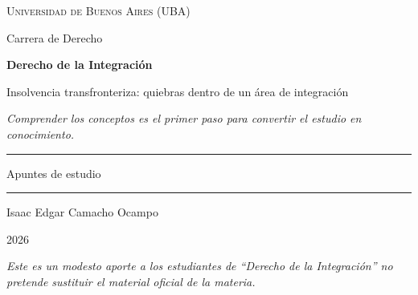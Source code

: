 \documentclass[12pt,oneside]{book}
\newcommand{\universidad}{Universidad de Buenos Aires (UBA)}
\newcommand{\carrera}{Carrera de Derecho}
\newcommand{\materia}{Derecho de la Integración}
\newcommand{\titulo}{Insolvencia transfronteriza: quiebras dentro de un área de integración}
\newcommand{\autor}{Isaac Edgar Camacho Ocampo}
\newcommand{\anio}{2026}
\begin{document}
\begin{titlepage}

\thispagestyle{empty}

\begin{center}

\vspace*{1cm}

{\large \textsc{\universidad}}

\vspace{0.2cm}

{\large \carrera}

\vspace{3cm}

{\Huge \textbf{\materia}}

\vspace{1cm}

{\LARGE \titulo}

\vspace{0.8cm}

\textit{Comprender los conceptos es el primer paso para convertir el estudio en conocimiento.}

\vspace{1.2cm}

\rule{0.70\textwidth}{0.5pt}

\vspace{0.5cm}

{\large Apuntes de estudio}

\vspace{0.5cm}

\rule{0.70\textwidth}{0.5pt}

\vfill

{\large \autor}

\vspace{0.3cm}

{\large \anio}

\end{center}

\vfill

\begin{flushleft}
\textit{Este es un modesto aporte a los estudiantes de ``Derecho de la Integración'' no pretende sustituir el material oficial de la materia.}
\end{flushleft}

\end{titlepage}

\tableofcontents
\clearpage

\end{document}
